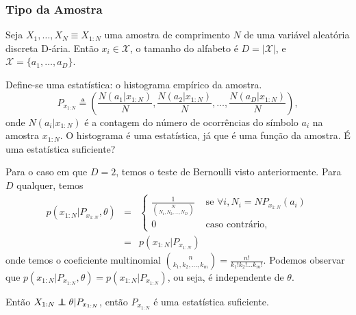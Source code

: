 \begin{frame}[allowframebreaks]
  \frametitle{Tipo da Amostra}
  \begin{example}
  Seja $X_1, \ldots, X_N \equiv X_{1:N}$ uma amostra de comprimento $N$ de uma variável aleatória
  discreta D-ária. Então $x_i \in \mathcal{X}$, o tamanho do alfabeto é $D=\vert \mathcal{X} \vert$,
  e $\mathcal{X} = \{a_1, \ldots , a_D\}$.

  Define-se uma estatística: o histograma empírico da amostra.
        \begin{equation}
        P_{x_{1:N}} \triangleq \left( \frac{N(a_1|x_{1:N})}{N} , \frac{N(a_2|x_{1:N})}{N} , \ldots , \frac{N(a_D|x_{1:N})}{N}  \right) ,
        \end{equation}
  onde $N(a_i|x_{1:N})$ é a contagem do número de ocorrências do símbolo $a_i$ na amostra $x_{1:N}$.
  O histograma é uma estatística, já que é uma função da amostra. É uma estatística suficiente?

  \examplebreak
  Para o caso em que $D=2$, temos o teste de Bernoulli visto anteriormente. Para $D$ qualquer, temos
        \begin{eqnarray}
        p(x_{1:N}|P_{x_{1:N}},\theta) &=& 
                \begin{cases}
                \frac{1}{{N \choose {N_1, N_2, \ldots, N_D}}} & \text{ se } \forall i , N_i = N P_{x_{1:N}}(a_i) \\
                0       & \text{ caso contrário,}
                \end{cases} \nonumber \\
                &=& p(x_{1:N} \vert P_{x_{1:N}})
        \end{eqnarray}
        onde temos o coeficiente multinomial 
        ${n \choose {k_1, k_2, \ldots, k_m}} = \frac{n!}{k_1! k_2! \ldots k_m!}$. 
        Podemos observar que $p(x_{1:N}|P_{x_{1:N}},\theta) = p(x_{1:N}|P_{x_{1:N}})$, ou seja, 
        é independente de $\theta$.

  Então $X_{1:N} \independent \theta \vert P_{x_{1:N}}$, então $P_{x_{1:N}}$ é uma estatística suficiente.
  \end{example}
\end{frame}

